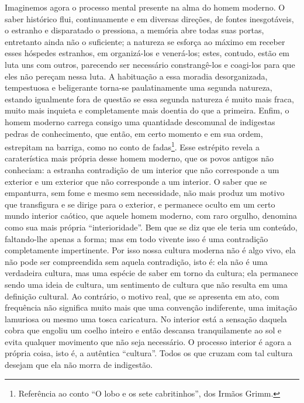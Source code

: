 \begin{enumerate}
\begin{enumerate}
    Imaginemos agora o processo mental presente na alma do homem
    moderno. O saber histórico flui, continuamente e em diversas
    direções, de fontes inesgotáveis, o estranho e disparatado o
    pressiona, a memória abre todas suas portas, entretanto ainda não o
    suficiente; a natureza se esforça ao máximo em receber esses
    hóspedes estranhos, em organizá-los e venerá-los; estes, contudo,
    estão em luta uns com outros, parecendo ser necessário
    constrangê-los e coagi-los para que eles não pereçam nessa luta. A
    habituação a essa moradia desorganizada, tempestuosa e beligerante
    torna-se paulatinamente uma segunda natureza, estando igualmente
    fora de questão se essa segunda natureza é muito mais fraca, muito
    mais inquieta e completamente mais doentia do que a primeira. Enfim,
    o homem moderno carrega consigo uma quantidade descomunal de
    indigestas pedras de conhecimento, que então, em certo momento e em
    sua ordem, estrepitam na barriga, como no conto de fadas\footnote{Referência
      ao conto ``O lobo e os sete cabritinhos'', dos Irmãos Grimm.}.
    Esse estrépito revela a caraterística mais própria desse homem
    moderno, que os povos antigos não conheciam: a estranha contradição
    de um interior que não corresponde a um exterior e um exterior que
    não corresponde a um interior. O saber que se empanturra, sem fome e
    mesmo sem necessidade, não mais produz um motivo que transfigura e
    se dirige para o exterior, e permanece oculto em um certo mundo
    interior caótico, que aquele homem moderno, com raro orgulho,
    denomina como sua mais própria ``interioridade''. Bem que se diz que
    ele teria um conteúdo, faltando-lhe apenas a forma; mas em todo
    vivente isso é uma contradição completamente impertinente. Por isso
    nossa cultura moderna não é algo vivo, ela não pode ser compreendida
    sem aquela contradição, isto é: ela não é uma verdadeira cultura,
    mas uma espécie de saber em torno da cultura; ela permanece sendo
    uma ideia de cultura, um sentimento de cultura que não resulta em
    uma definição cultural. Ao contrário, o motivo real, que se
    apresenta em ato, com frequência não significa muito mais que uma
    convenção indiferente, uma imitação lamuriosa ou mesmo uma tosca
    caricatura. No interior está a sensação daquela cobra que engoliu um
    coelho inteiro e então descansa tranquilamente ao sol e evita
    qualquer movimento que não seja necessário. O processo interior é
    agora a própria coisa, isto é, a autêntica ``cultura''. Todos os que
    cruzam com tal cultura desejam que ela não morra de indigestão.

\end{enumerate}
\end{enumerate}
